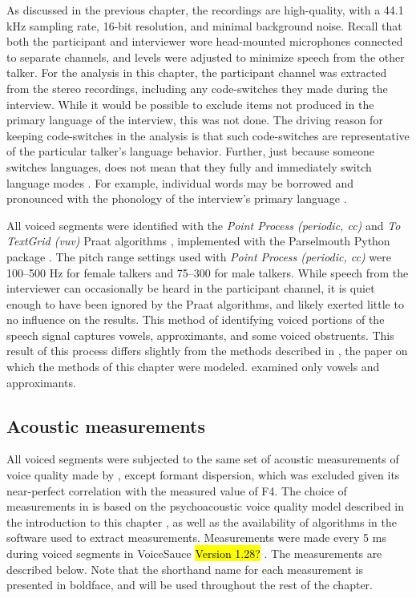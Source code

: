 As discussed in the previous chapter, the recordings are high-quality, with a 44.1 kHz sampling rate, 16-bit resolution, and minimal background noise. Recall that both the participant and interviewer wore head-mounted microphones connected to separate channels, and levels were adjusted to minimize speech from the other talker. For the analysis in this chapter, the participant channel was extracted from the stereo recordings, including any code-switches they made during the interview. While it would be possible to exclude items not produced in the primary language of the interview, this was not done. The driving reason for keeping code-switches in the analysis is that such code-switches are representative of the particular talker's language behavior. Further, just because someone switches languages, does not mean that they fully and immediately switch language modes \citep[e.g.,][]{fricke_2016_phonetic}. For example, individual words may be borrowed and pronounced with the phonology of the interview's primary language \citep[c.f.., the matrix language in code-switching][]{myersscotton_2011_matrix}. 

All voiced segments were identified with the \textit{Point Process (periodic, cc)} and \textit{To TextGrid (vuv)} Praat algorithms \citep{boersma_2021_praat}, implemented with the Parselmouth Python package \citep{jadoul_2018_parselmouth}. The pitch range settings used with \textit{Point Process (periodic, cc)} were 100--500 Hz for female talkers and 75--300 for male talkers. While speech from the interviewer can occasionally be heard in the participant channel, it is quiet enough to have been ignored by the Praat algorithms, and likely exerted little to no influence on the results. This method of identifying voiced portions of the speech signal captures vowels, approximants, and some voiced obstruents. This result of this process differs slightly from the methods described in \citet{lee_2019_acoustic}, the paper on which the methods of this chapter were modeled. \citet{lee_2019_acoustic} examined only vowels and approximants. 

\subsection{Acoustic measurements}\label{ch3:sec:acoustic}
All voiced segments were subjected to the same set of acoustic measurements of voice quality made by \citet{lee_2019_acoustic}, except formant dispersion, which was excluded given its near-perfect correlation with the measured value of F4. The choice of measurements in \citet{lee_2019_acoustic} is based on the psychoacoustic voice quality model described in the introduction to this chapter \citep{kreiman_2014_theory}, as well as the availability of algorithms in the software used to extract measurements. Measurements were made every 5 ms during voiced segments in VoiceSauce \hl{Version 1.28?} \citep{shue_2011_voicesauce}. The measurements are described below. Note that the shorthand name for each measurement is presented in boldface, and will be used throughout the rest of the chapter. 

